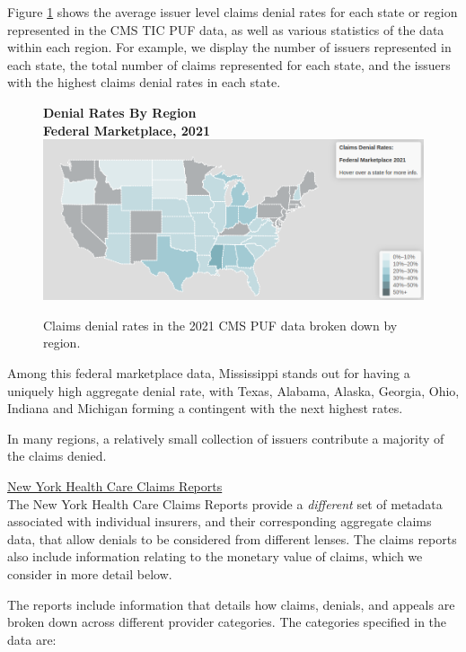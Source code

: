 \documentclass[12pt, a4paper,twoside,parskip=full]{report}
\theoremstyle{plain} %
\theoremstyle{definition} %
\theoremstyle{remark} %
\numberwithin{equation}{chapter}
\begin{document}
		
		\clearpage
		
		Figure \ref{federalbyregion} shows the average issuer level claims denial rates for each state or region represented in the CMS TIC PUF data, as well as various statistics of the data within each region. For example, we display the number of issuers represented in each state, the total number of claims represented for each state, and the issuers with the highest claims denial rates in each state.
					
					
		\begin{figure}[h!]
			\centering
			\textbf{Denial Rates By Region}\\
			\textbf{Federal Marketplace, 2021}\\
			\includegraphics[width=\columnwidth]{images/cms_puf/federal_denial_rates.png}
			\caption{Claims denial rates in the 2021 CMS PUF data broken down by region.}
			\label{federalbyregion}
		\end{figure}
	
		Among this federal marketplace data, Mississippi stands out for having a uniquely high aggregate denial rate, with Texas, Alabama, Alaska, Georgia, Ohio, Indiana and Michigan forming a contingent with the next highest rates.
		
		In many regions, a relatively small collection of issuers contribute a majority of the claims denied.
		
		\underline{New York Health Care Claims Reports}\\
		
		The New York Health Care Claims Reports provide a \emph{different} set of metadata associated with individual insurers, and their corresponding aggregate claims data, that allow denials to be considered from different lenses. The claims reports also include information relating to the monetary value of claims, which we consider in more detail below.
		
		The reports include information that details how claims, denials, and appeals are broken down across different provider categories. The categories specified in the data are:
		
\end{document}
